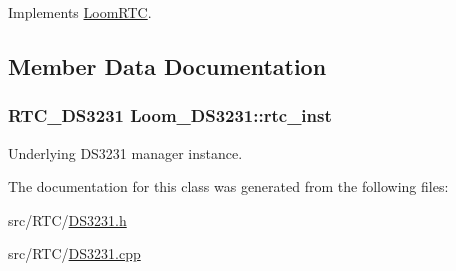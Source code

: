 Implements \hyperlink{class_loom_r_t_c_a34b7dd8dacbfdb61876cc4aabb79e67e}{Loom\+R\+TC}.



\subsection{Member Data Documentation}
\subsubsection[{\texorpdfstring{rtc\+\_\+inst}{rtc_inst}}]{\setlength{\rightskip}{0pt plus 5cm}R\+T\+C\+\_\+\+D\+S3231 Loom\+\_\+\+D\+S3231\+::rtc\+\_\+inst\hspace{0.3cm}{\ttfamily [protected]}}\hypertarget{class_loom___d_s3231_a3407d04f9e8cd13b2cfee640818f5e4b}{}\label{class_loom___d_s3231_a3407d04f9e8cd13b2cfee640818f5e4b}


Underlying D\+S3231 manager instance. 



The documentation for this class was generated from the following files\+:\begin{DoxyCompactItemize}
\item 
src/\+R\+T\+C/\hyperlink{_d_s3231_8h}{D\+S3231.\+h}\item 
src/\+R\+T\+C/\hyperlink{_d_s3231_8cpp}{D\+S3231.\+cpp}\end{DoxyCompactItemize}
